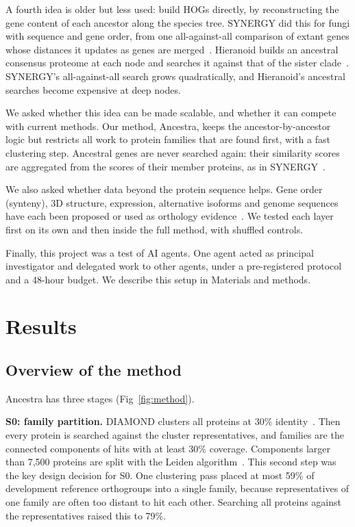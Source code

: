 A fourth idea is older but less used: build HOGs directly, by reconstructing the gene content of each ancestor along the species tree. SYNERGY did this for fungi with sequence and gene order, from one all-against-all comparison of extant genes whose distances it updates as genes are merged~\cite{wapinski2007synergy}. Hieranoid builds an ancestral consensus proteome at each node and searches it against that of the sister clade~\cite{schreiber2013hieranoid,kaduk2017hieranoid2}. SYNERGY's all-against-all search grows quadratically, and Hieranoid's ancestral searches become expensive at deep nodes.

We asked whether this idea can be made scalable, and whether it can compete with current methods. Our method, Ancestra, keeps the ancestor-by-ancestor logic but restricts all work to protein families that are found first, with a fast clustering step. Ancestral genes are never searched again: their similarity scores are aggregated from the scores of their member proteins, as in SYNERGY~\cite{wapinski2007synergy}.

We also asked whether data beyond the protein sequence helps. Gene order (synteny), 3D structure, expression, alternative isoforms and genome sequences have each been proposed or used as orthology evidence~\cite{lechner2014poff,ludwig2024orthorefine,moi2025foldtree,bastian2025bgee,kirilenko2023toga}. We tested each layer first on its own and then inside the full method, with shuffled controls.

Finally, this project was a test of AI agents. One agent acted as principal investigator and delegated work to other agents, under a pre-registered protocol and a 48-hour budget. We describe this setup in Materials and methods.

\section*{Results}

\subsection*{Overview of the method}
Ancestra has three stages (Fig~\ref{fig:method}).

\textbf{S0: family partition.} DIAMOND clusters all proteins at 30\% identity~\cite{buchfink2021diamond,buchfink2026deepclust}. Then every protein is searched against the cluster representatives, and families are the connected components of hits with at least 30\% coverage. Components larger than 7,500 proteins are split with the Leiden algorithm~\cite{traag2019leiden}. This second step was the key design decision for S0. One clustering pass placed at most 59\% of development reference orthogroups into a single family, because representatives of one family are often too distant to hit each other. Searching all proteins against the representatives raised this to 79\%.

